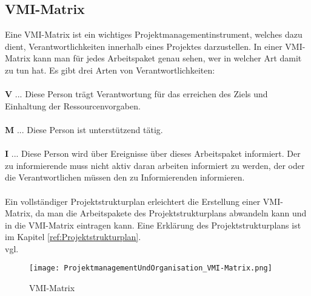\subsection{VMI-Matrix}
\label{sec:VMI-Matrix}
Eine VMI-Matrix ist ein wichtiges Projektmanagementinstrument, welches dazu dient, Verantwortlichkeiten innerhalb eines Projektes darzustellen. In einer VMI-Matrix kann man für jedes Arbeitspaket genau sehen, wer in welcher Art damit zu tun hat. Es gibt drei Arten von Verantwortlichkeiten: \\ \\
\textbf{V} ... Diese Person trägt Verantwortung für das erreichen des Ziels und Einhaltung der Ressourcenvorgaben.\\ \\
\textbf{M} ... Diese Person ist unterstützend tätig.\\ \\
\textbf{I} ... Diese Person wird über Ereignisse über dieses Arbeitspaket informiert. Der zu informierende muss nicht aktiv daran arbeiten informiert zu werden, der oder die Verantwortlichen müssen den zu Informierenden informieren.\\ \\
Ein vollständiger Projektstrukturplan erleichtert die Erstellung einer VMI-Matrix, da man die Arbeitspakete des Projektstrukturplans abwandeln kann und in die VMI-Matrix eintragen kann. Eine Erklärung des Projektstrukturplans ist im Kapitel \ref{ref:Projektstrukturplan}.\\vgl. 
\textcite{VMI-Matrix}\\

\begin{figure}[H]
	\texttt{[image: ProjektmanagementUndOrganisation\_VMI-Matrix.png]}
    \caption{VMI-Matrix}
    \label{fig:vmi-Matrix}
\end{figure}


\pagebreak	
		
